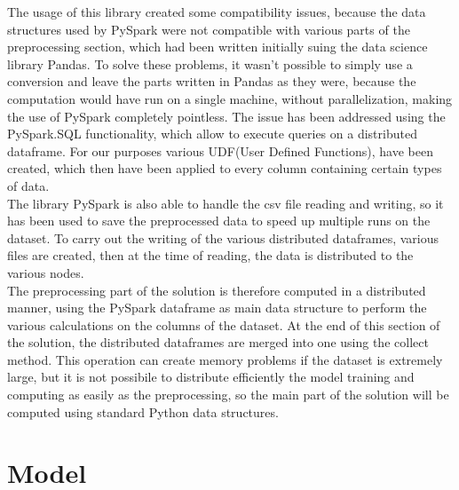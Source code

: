 \documentclass[
	letterpaper, %
	10pt, %
]{class}
\begin{document}

The usage of this library created some compatibility issues, because the data structures used by PySpark were not compatible with various parts of the preprocessing section, which had been written initially suing the data science library Pandas.
To solve these problems, it wasn't possible to simply use a conversion and leave the parts written in Pandas as they were, because the computation would have run on a single machine, without parallelization, making the use of PySpark completely pointless.
The issue has been addressed using the PySpark.SQL functionality, which allow to execute queries on a distributed dataframe. For our purposes various UDF(User Defined Functions), have been created, which then have been applied to every column containing certain types of data.\\

The library PySpark is also able to handle the csv file reading and writing, so it has been used to save the preprocessed data to speed up multiple runs on the dataset. To carry out the writing of the various distributed dataframes, various files are created, then at the time of reading, the data is distributed to the various nodes.\\

The preprocessing part of the solution is therefore computed in a distributed manner, using the PySpark dataframe as main data structure to perform the various calculations on the columns of the dataset.
At the end of this section of the solution, the distributed dataframes are merged into one using the collect method. This operation can create memory problems if the dataset is extremely large, but it is not possibile to distribute efficiently the model training
and computing as easily as the preprocessing, so the main part of the solution will be computed using standard Python data structures.


\section{Model}
\end{document}
